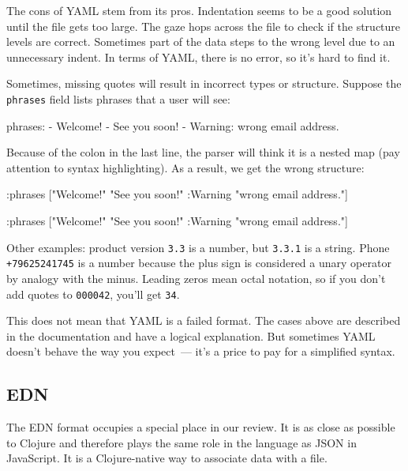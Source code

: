The cons of YAML stem from its pros. Indentation seems to be a good solution until the file gets too large. The gaze hops across the file to check if the structure levels are correct. Sometimes part of the data steps to the wrong level due to an unnecessary indent. In terms of YAML, there is no error, so it's hard to find it.

Sometimes, missing quotes will result in incorrect types or structure. Suppose the \verb|phrases| field lists phrases that a user will see:

\begin{yaml}
phrases:
  - Welcome!
  - See you soon!
  - Warning: wrong email address.
\end{yaml}

Because of the colon in the last line, the parser will think it is a nested map (pay attention to syntax highlighting). As a result, we get the wrong structure:

\ifnarrow

\begin{clojure}
{:phrases
 ["Welcome!"
  "See you soon!"
  {:Warning "wrong email address."}]}
\end{clojure}

\else

\begin{clojure}
{:phrases ["Welcome!"
           "See you soon!"
           {:Warning "wrong email address."}]}
\end{clojure}

\fi

Other examples: product version \verb|3.3| is a number, but \verb|3.3.1| is a string. Phone \texttt{+79625241745} is a number because the plus sign is considered a unary operator by analogy with the minus. Leading zeros mean octal notation, so if you don't add quotes to \verb|000042|, you'll get \verb|34|.

This does not mean that YAML is a failed format. The cases above are described in the documentation and have a logical explanation. But sometimes YAML doesn't behave the way you expect~--- it’s a price to pay for a simplified syntax.

\subsection{EDN}


The EDN format occupies a special place in our review. It is as close as possible to Clojure and therefore plays the same role in the language as JSON in JavaScript. It is a Clojure-native way to associate data with a file.

